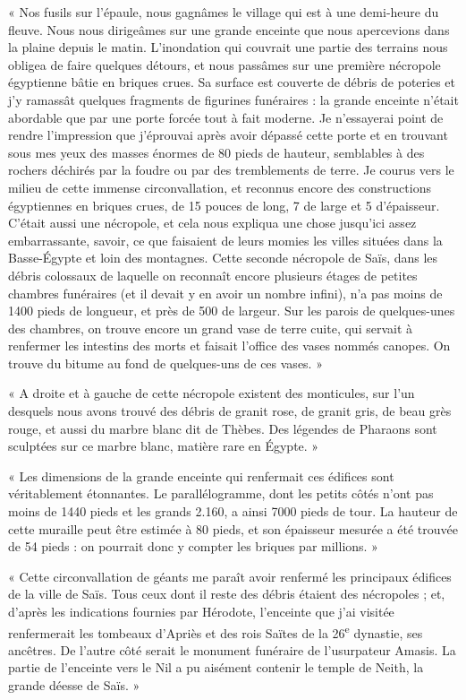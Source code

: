 \documentclass[a4paper, 11pt, oneside]{article}
\begin{document}
« Nos fusils sur l'épaule, nous gagnâmes le village qui est à une demi-heure du fleuve. Nous nous dirigeâmes sur une grande enceinte que nous apercevions dans la plaine depuis le matin. L'inondation qui couvrait une partie des terrains nous obligea de faire quelques détours, et nous passâmes sur une première nécropole égyptienne bâtie en briques crues. Sa surface est couverte de débris de poteries et j'y ramassât quelques fragments de figurines funéraires : la grande enceinte n'était abordable que par une porte forcée tout à fait moderne. Je n'essayerai point de rendre l'impression que j'éprouvai après avoir dépassé cette porte et en trouvant sous mes yeux des masses énormes de 80 pieds de hauteur, semblables à des rochers déchirés par la foudre ou par des tremblements de terre. Je courus vers le milieu de cette immense circonvallation, et reconnus encore des constructions égyptiennes en briques crues, de 15 pouces de long, 7 de large et 5 d'épaisseur. C'était aussi une nécropole, et cela nous expliqua une chose jusqu'ici assez embarrassante, savoir, ce que faisaient de leurs momies les villes situées dans la Basse-Égypte et loin des montagnes. Cette seconde nécropole de Saïs, dans les débris colossaux de laquelle on reconnaît encore plusieurs étages de petites chambres funéraires (et il devait y en avoir un nombre infini), n'a pas moins de 1400 pieds de longueur, et près de 500 de largeur. Sur les parois de quelques-unes des chambres, on trouve encore un grand vase de terre cuite, qui servait à renfermer les intestins des morts et faisait l'office des vases nommés canopes. On trouve du bitume au fond de quelques-uns de ces vases. »

« A droite et à gauche de cette nécropole existent des monticules, sur l'un desquels nous avons trouvé des débris de granit rose, de granit gris, de beau grès rouge, et aussi du marbre blanc dit de Thèbes. Des légendes de Pharaons sont sculptées sur ce marbre blanc, matière rare en Égypte. »

« Les dimensions de la grande enceinte qui renfermait ces édifices sont véritablement étonnantes. Le parallélogramme, dont les petits côtés n'ont pas moins de 1440 pieds et les grands 2.160, a ainsi 7000 pieds de tour. La hauteur de cette muraille peut être estimée à 80 pieds, et son épaisseur mesurée a été trouvée de 54 pieds : on pourrait donc y compter les briques par millions. »

« Cette circonvallation de géants me paraît avoir renfermé les principaux édifices de la ville de Saïs. Tous ceux dont il reste des débris étaient des nécropoles ; et, d'après les indications fournies par Hérodote, l'enceinte que j'ai visitée renfermerait les tombeaux d'Apriès et des rois Saïtes de la 26\textsuperscript{e} dynastie, ses ancêtres. De l'autre côté serait le monument funéraire de l'usurpateur Amasis. La partie de l'enceinte vers le Nil a pu aisément contenir le temple de Neith, la grande déesse de Saïs. »
\end{document}
